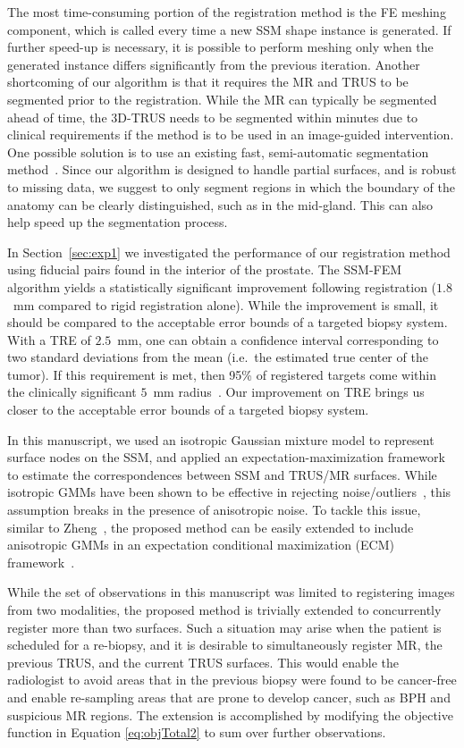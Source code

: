 \documentclass[journal]{IEEEtran}
\begin{document}
The most time-consuming portion of the registration method is the FE meshing component, which is called every time a new SSM shape instance is generated. If further speed-up is necessary, it is possible to perform meshing only when the generated instance differs significantly from the previous iteration. Another shortcoming of our algorithm is that it requires the MR and TRUS to be segmented prior to the registration. While the MR can typically be segmented ahead of time, the 3D-TRUS needs to be segmented within minutes due to clinical requirements if the method is to be used in an image-guided intervention. One possible solution is to use an existing fast, semi-automatic segmentation method~\cite{Qiu12a}. Since our algorithm is designed to handle partial surfaces, and is robust to missing data, we suggest to only segment regions in which the boundary of the anatomy can be clearly distinguished, such as in the mid-gland. This can also help speed up the segmentation process.

In Section~\ref{sec:exp1} we investigated the performance of our registration method using fiducial pairs found in the interior of the prostate. The SSM-FEM algorithm yields a statistically significant improvement following registration ($1.8$~mm compared to rigid registration alone). While the improvement is small, it should be compared to the acceptable error bounds of a targeted biopsy system. With a TRE of $2.5$~mm, one can obtain a confidence interval corresponding to two standard deviations from the mean (i.e.~the estimated true center of the tumor). If this requirement is met, then 95\% of registered targets come within the clinically significant $5$~mm radius~\cite{Karnik10a}. Our improvement on TRE brings us closer to the acceptable error bounds of a targeted biopsy system.

In this manuscript, we used an isotropic Gaussian mixture model to represent surface nodes on the SSM, and applied an expectation-maximization framework to estimate the correspondences between SSM and TRUS/MR surfaces. While isotropic GMMs have been shown to be effective in rejecting noise/outliers~\cite{Myronenko10a}, this assumption breaks in the presence of anisotropic noise. To tackle this issue, similar to Zheng~\cite{Zheng13a}, the proposed method can be easily extended to include anisotropic GMMs in an expectation conditional maximization (ECM) framework~\cite{Horaud11a}.

While the set of observations in this manuscript was limited to registering images from two modalities, the proposed method is trivially extended to concurrently register more than two surfaces. Such a situation may arise when the patient is scheduled for a re-biopsy, and it is desirable to simultaneously register MR, the previous TRUS, and the current TRUS surfaces. This would enable the radiologist to avoid areas that in the previous biopsy were found to be cancer-free and enable re-sampling areas that are prone to develop cancer, such as BPH and suspicious MR regions.  The extension is accomplished by modifying the objective function in Equation \eqref{eq:objTotal2} to sum over further observations.
\end{document}
